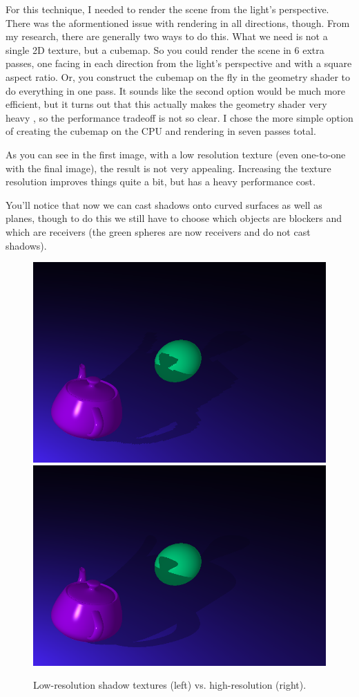 \documentclass[acmsmall, screen, authorversion, nonacm]{acmart}
\begin{document}
For this technique, I needed to render the scene from the light's perspective. There was the aformentioned issue with rendering in all directions, though. From my research, there are generally two ways to do this. What we need is not a single 2D texture, but a cubemap. So you could render the scene in 6 extra passes, one facing in each direction from the light's perspective and with a square aspect ratio. Or, you construct the cubemap on the fly in the geometry shader to do everything in one pass. It sounds like the second option would be much more efficient, but it turns out that this actually makes the geometry shader very heavy \cite{de2015learn, akenine2019real}, so the performance tradeoff is not so clear. I chose the more simple option of creating the cubemap on the CPU and rendering in seven passes total.

As you can see in the first image, with a low resolution texture (even one-to-one with the final image), the result is not very appealing. Increasing the texture resolution improves things quite a bit, but has a heavy performance cost.

You'll notice that now we can cast shadows onto curved surfaces as well as planes, though to do this we still have to choose which objects are blockers and which are receivers (the green spheres are now receivers and do not cast shadows).

\begin{figure}
	\includegraphics[width=.49\linewidth]{images/textures_1}\hfill
	\includegraphics[width=.49\linewidth]{images/textures_2}
	\caption{Low-resolution shadow textures (left) vs. high-resolution (right).}
\end{figure}
\end{document}
